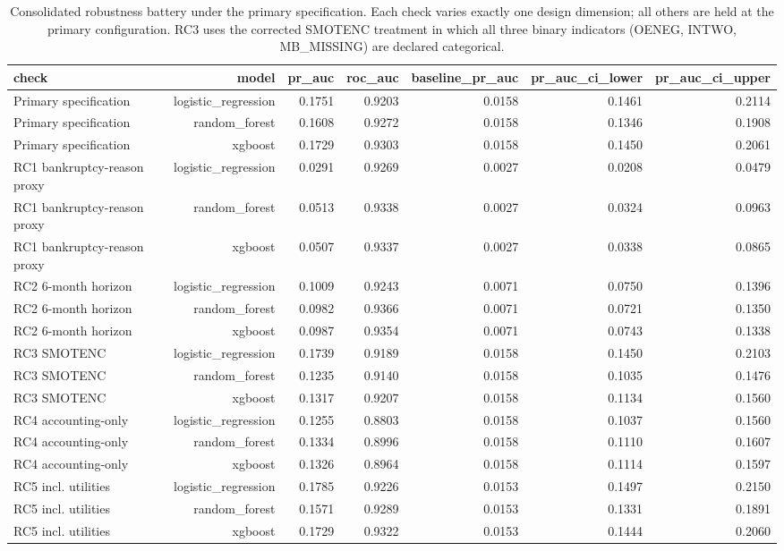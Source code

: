 \begin{table}[htbp]
\centering
\caption{Consolidated robustness battery under the primary specification. Each check varies exactly one design dimension; all others are held at the primary configuration. RC3 uses the corrected SMOTENC treatment in which all three binary indicators (OENEG, INTWO, MB\_MISSING) are declared categorical.}
\label{tab:v2_robustness_consolidated}
\small
\begin{tabular}{lrrrrrr}
\toprule
check & model & pr\_auc & roc\_auc & baseline\_pr\_auc & pr\_auc\_ci\_lower & pr\_auc\_ci\_upper \\
\midrule
Primary specification & logistic\_regression & 0.1751 & 0.9203 & 0.0158 & 0.1461 & 0.2114 \\
Primary specification & random\_forest & 0.1608 & 0.9272 & 0.0158 & 0.1346 & 0.1908 \\
Primary specification & xgboost & 0.1729 & 0.9303 & 0.0158 & 0.1450 & 0.2061 \\
RC1 bankruptcy-reason proxy & logistic\_regression & 0.0291 & 0.9269 & 0.0027 & 0.0208 & 0.0479 \\
RC1 bankruptcy-reason proxy & random\_forest & 0.0513 & 0.9338 & 0.0027 & 0.0324 & 0.0963 \\
RC1 bankruptcy-reason proxy & xgboost & 0.0507 & 0.9337 & 0.0027 & 0.0338 & 0.0865 \\
RC2 6-month horizon & logistic\_regression & 0.1009 & 0.9243 & 0.0071 & 0.0750 & 0.1396 \\
RC2 6-month horizon & random\_forest & 0.0982 & 0.9366 & 0.0071 & 0.0721 & 0.1350 \\
RC2 6-month horizon & xgboost & 0.0987 & 0.9354 & 0.0071 & 0.0743 & 0.1338 \\
RC3 SMOTENC & logistic\_regression & 0.1739 & 0.9189 & 0.0158 & 0.1450 & 0.2103 \\
RC3 SMOTENC & random\_forest & 0.1235 & 0.9140 & 0.0158 & 0.1035 & 0.1476 \\
RC3 SMOTENC & xgboost & 0.1317 & 0.9207 & 0.0158 & 0.1134 & 0.1560 \\
RC4 accounting-only & logistic\_regression & 0.1255 & 0.8803 & 0.0158 & 0.1037 & 0.1560 \\
RC4 accounting-only & random\_forest & 0.1334 & 0.8996 & 0.0158 & 0.1110 & 0.1607 \\
RC4 accounting-only & xgboost & 0.1326 & 0.8964 & 0.0158 & 0.1114 & 0.1597 \\
RC5 incl. utilities & logistic\_regression & 0.1785 & 0.9226 & 0.0153 & 0.1497 & 0.2150 \\
RC5 incl. utilities & random\_forest & 0.1571 & 0.9289 & 0.0153 & 0.1331 & 0.1891 \\
RC5 incl. utilities & xgboost & 0.1729 & 0.9322 & 0.0153 & 0.1444 & 0.2060 \\
\bottomrule
\end{tabular}
\end{table}
